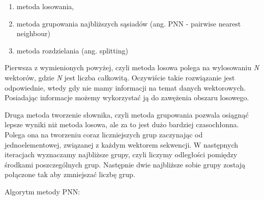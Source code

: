 \documentclass{article}
\begin{document}
\begin{enumerate}
  \item metoda losowania,
  \item metoda grupowania najbliższych sąsiadów (ang. PNN - pairwise nearest neighbour)
  \item metoda rozdzielania (ang. splitting) 
\end{enumerate}

Pierwsza z wymienionych powyżej, czyli metoda losowa polega na wylosowaniu \textit{N} wektorów, gdzie \textit{N} jest liczba całkowitą. Oczywiście takie rozwiązanie jest odpowiednie, wtedy gdy nie mamy informacji na temat danych wektorowych. Posiadając informacje możemy wykorzystać ją do zawężenia obszaru losowego.

Druga metoda tworzenie słownika, czyli metoda grupowania pozwala osiągnąć lepsze wyniki niż metoda losowa, ale za to jest dużo bardziej czasochłonna. Polega ona na tworzeniu coraz liczniejszych grup zaczynając od jednoelementowej, związanej z każdym wektorem sekwencji. W następnych iteracjach wyznaczamy najbliższe grupy, czyli liczymy odległości pomiędzy środkami poszczególnych grup. Następnie dwie najbliższe sobie grupy zostają połączone tak aby zmniejszać liczbę grup.

Algorytm metody PNN:
\end{document}
